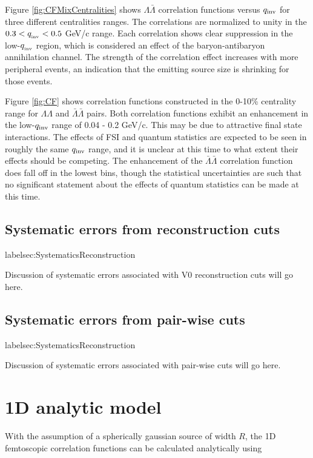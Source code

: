 

Figure \ref{fig:CFMixCentralities} shows $\Lambda\bar{\Lambda}$ correlation functions versus $q_{\rm inv}$ for three different centralities ranges.  The correlations are normalized to unity in the $ 0.3 < q_{\rm_{inv}} < 0.5$ GeV/c range.  Each correlation shows clear suppression in the low-$q_{\rm_{inv}}$ region, which is considered an effect of the baryon-antibaryon annihilation channel.  The strength of the correlation effect increases with more peripheral events, an indication that the emitting source size is shrinking for those events.

Figure \ref{fig:CF} shows correlation functions constructed in the 0-10\% centrality range for $\Lambda\Lambda$ and $\bar{\Lambda}\bar{\Lambda}$ pairs.  Both correlation functions exhibit an enhancement in the low-$q_{\rm inv}$ range of 0.04 - 0.2 GeV/c.  This may be due to attractive final state interactions.  The effects of FSI and quantum statistics are expected to be seen in roughly the same $q_{\rm inv}$ range, and it is unclear at this time to what extent their effects should be competing. The enhancement of the $\bar{\Lambda}\bar{\Lambda}$ correlation function does fall off in the lowest bins, though the statistical uncertainties are such that no significant statement about the effects of quantum statistics can be made at this time.



\subsection{Systematic errors from reconstruction cuts}
label{sec:SystematicsReconstruction}

Discussion of systematic errors associated with V0 reconstruction cuts will go here.

\subsection{Systematic errors from pair-wise cuts}
label{sec:SystematicsReconstruction}

Discussion of systematic errors associated with pair-wise cuts will go here.

\section{1D analytic model}
With the assumption of a spherically gaussian source of width $R$, the 1D femtoscopic correlation functions can be calculated analytically \cite{lednicky82} using 

